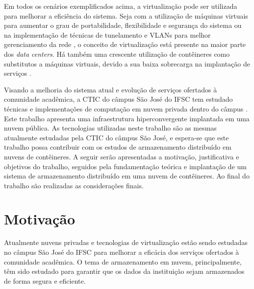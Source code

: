 Em todos os cenários exemplificados acima, a virtualização pode ser utilizada para melhorar a eficiência do sistema. Seja com a utilização de máquinas virtuais para aumentar o grau de portabilidade, flexibilidade e segurança do sistema \cite{tanenbaum} ou na implementação de técnicas de tunelamento e \ac{VLANs} para melhor gerenciamento da rede \cite{sdn}, o conceito de virtualização está presente na maior parte dos \textit{data centers}. Há também uma crescente utilização de contêineres como substitutos a máquinas virtuais, devido a sua baixa sobrecarga na implantação de serviços \cite{modellingkubernetes}.

Visando a melhoria do sistema atual e evolução de serviços ofertados à comunidade acadêmica, a \ac{CTIC} do câmpus São José do \ac{IFSC} tem estudado técnicas e implementações de computação em nuvem privada dentro do câmpus \cite{github-sj}. 
Este trabalho apresenta uma infraestrutura hiperconvergente implantada em uma nuvem pública. As tecnologias utilizadas neste trabalho são as mesmas atualmente estudadas pela \ac{CTIC} do câmpus São José, e espera-se que este trabalho possa contribuir com os estudos de armazenamento distribuído em nuvens de contêineres. A seguir serão apresentadas a motivação, justificativa e objetivos do trabalho, seguidos pela fundamentação teórica e implantação de um sistema de armazenamento distribuído em uma nuvem de contêineres. Ao final do trabalho são realizadas as considerações finais.

\section{Motivação}

Atualmente nuvens privadas e tecnologias de virtualização estão sendo estudadas no câmpus São José do \ac{IFSC} para melhorar a eficácia dos serviços ofertados à comunidade acadêmica. O tema de armazenamento em nuvem, principalmente, têm sido estudado para garantir que os dados da instituição sejam armazenados de forma segura e eficiente.


